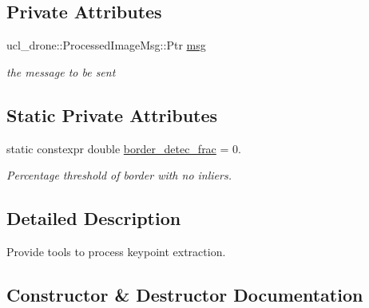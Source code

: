 \subsection*{Private Attributes}
\begin{DoxyCompactItemize}
\item 
\mbox{\label{classProcessedImage_a8e3f0066b0fd5f1b858f0d977d8cb8ff}} 
ucl\+\_\+drone\+::\+Processed\+Image\+Msg\+::\+Ptr \hyperlink{classProcessedImage_a8e3f0066b0fd5f1b858f0d977d8cb8ff}{msg}
\begin{DoxyCompactList}\small\item\em the message to be sent \end{DoxyCompactList}\end{DoxyCompactItemize}
\subsection*{Static Private Attributes}
\begin{DoxyCompactItemize}
\item 
\mbox{\label{classProcessedImage_a8cc90ba7c11bfc4aa5c711b0b6d5f236}} 
static constexpr double \hyperlink{classProcessedImage_a8cc90ba7c11bfc4aa5c711b0b6d5f236}{border\+\_\+detec\+\_\+frac} = 0.
\begin{DoxyCompactList}\small\item\em Percentage threshold of border with no inliers. \end{DoxyCompactList}\end{DoxyCompactItemize}


\subsection{Detailed Description}
Provide tools to process keypoint extraction. 

\subsection{Constructor \& Destructor Documentation}
\mbox{\label{classProcessedImage_a4733c93afcd9d3376cb5b1e02dbf6024}} 
